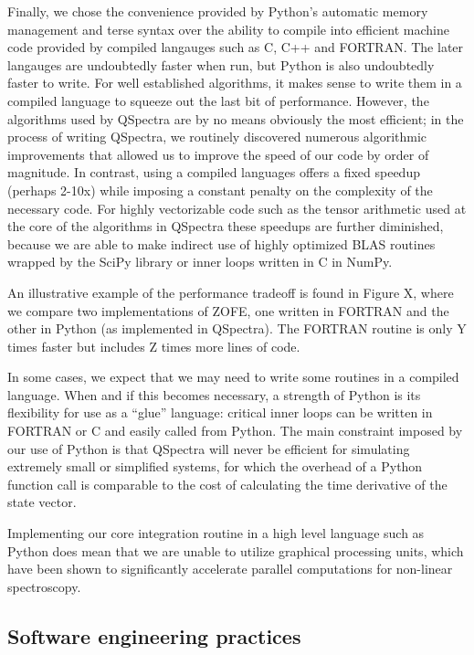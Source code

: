 \documentclass{article}
\begin{document}
Finally, we chose the convenience provided by Python's automatic memory management and terse syntax over the ability to compile into efficient machine code provided by compiled langauges such as C, C++ and FORTRAN. The later langauges are undoubtedly faster when run, but Python is also undoubtedly faster to write. For well established algorithms, it makes sense to write them in a compiled language to squeeze out the last bit of performance. However, the algorithms used by QSpectra are by no means obviously the most efficient; in the process of writing QSpectra, we routinely discovered numerous algorithmic improvements that allowed us to improve the speed of our code by order of magnitude. In contrast, using a compiled languages offers a fixed speedup (perhaps 2-10x) while imposing a constant penalty on the complexity of the necessary code. For highly vectorizable code such as the tensor arithmetic used at the core of the algorithms in QSpectra these speedups are further diminished, because we are able to make indirect use of highly optimized BLAS routines wrapped by the SciPy library or inner loops written in C in NumPy.

An illustrative example of the performance tradeoff is found in Figure X, where we compare two implementations of ZOFE, one written in FORTRAN and the other in Python (as implemented in QSpectra). The FORTRAN routine is only Y times faster but includes Z times more lines of code.

In some cases, we expect that we may need to write some routines in a compiled language. When and if this becomes necessary, a strength of Python is its flexibility for use as a ``glue'' language: critical inner loops can be written in FORTRAN or C and easily called from Python. The main constraint imposed by our use of Python is that QSpectra will never be efficient for simulating extremely small or simplified systems, for which the overhead of a Python function call is comparable to the cost of calculating the time derivative of the state vector.

Implementing our core integration routine in a high level language such as Python does mean that we are unable to utilize graphical processing units, which have been shown to significantly accelerate parallel computations for non-linear spectroscopy.

\subsection{Software engineering practices}
\end{document}
